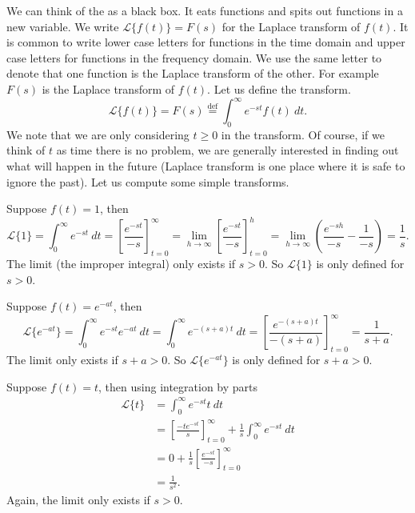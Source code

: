 We can think of the \emph{} as a black box.  It
eats functions and spits out functions in a new variable.  We write
$\mathcal{L} \{ f(t) \} = F(s)$ for the Laplace transform of $f(t)$.  It is common to write lower case letters for
functions in the time domain and upper case letters for functions in the
frequency domain.  We use the same letter to denote that one function
is the Laplace transform of the other.  For example $F(s)$ is the Laplace
transform of $f(t)$.  Let us define the transform.
\begin{equation*}
\mathcal{L} \{ f(t) \} =
F(s) \overset{\text{def}}{=} \int_0^\infty e^{-st} f(t) ~ dt .
\end{equation*}
We note that we are only considering $t \geq 0$ in the transform.  Of course,
if we think of $t$ as time there is no problem, we are generally interested in
finding out what will happen in the future (Laplace transform is one place
where it is safe to ignore the past).  Let us compute some simple
transforms.

\begin{example}
Suppose $f(t) = 1$, then
\begin{equation*}
\mathcal{L} \{1\} = \int_0^\infty e^{-st} ~ dt
=
\left[ \frac{e^{-st}}{-s} \right]_{t=0}^\infty
=
\lim_{h\to\infty}
\left[ \frac{e^{-st}}{-s} \right]_{t=0}^h
=
\lim_{h\to\infty}
\left( \frac{e^{-sh}}{-s} - \frac{1}{-s} \right)
= \frac{1}{s} .
\end{equation*}
The limit (the improper integral) only exists if $s > 0$.  So 
$\mathcal{L} \{1\}$ is only defined for $s > 0$.
\end{example}

\begin{example}
Suppose $f(t) = e^{-at}$, then
\begin{equation*}
\mathcal{L} \{e^{-at}\}
= \int_0^\infty e^{-st} e^{-at} ~ dt
= \int_0^\infty e^{-(s+a)t} ~ dt
=
\left[ \frac{e^{-(s+a)t}}{-(s+a)} \right]_{t=0}^\infty
= \frac{1}{s+a} .
\end{equation*}
The limit only exists if $s+a > 0$.  So 
$\mathcal{L} \{e^{-at}\}$ is only defined for $s+a > 0$.
\end{example}

\begin{example}
Suppose $f(t) = t$, then using integration by parts
\begin{equation*}
\begin{split}
\mathcal{L} \{t\}
& = \int_0^\infty e^{-st} t ~ dt \\
& =
\left[ \frac{-te^{-st}}{s} \right]_{t=0}^\infty
+
\frac{1}{s}
\int_0^\infty e^{-st} ~dt \\
& =
0
+
\frac{1}{s}
\left[ \frac{e^{-st}}{-s} \right]_{t=0}^\infty \\
& =
\frac{1}{s^2} .
\end{split}
\end{equation*}
Again, the limit only exists if $s > 0$.
\end{example}

